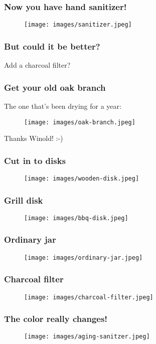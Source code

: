 \documentclass{beamer}
\begin{document}
\begin{frame}
\frametitle{Now you have hand sanitizer!}
\begin{figure}
\texttt{[image: images/sanitizer.jpeg]}
\end{figure}
\end{frame}

\begin{frame}
\frametitle{But could it be better?}
\huge{Add a charcoal filter?}
\end{frame}

\begin{frame}
\frametitle{Get your old oak branch}
The one that's been drying for a year:
\begin{figure}
\texttt{[image: images/oak-branch.jpeg]}
\end{figure}
Thanks Winold! :-)
\end{frame}

\begin{frame}
\frametitle{Cut in to disks}
\begin{figure}
\texttt{[image: images/wooden-disk.jpeg]}
\end{figure}
\end{frame}

\begin{frame}
\frametitle{Grill disk}
\begin{figure}
\texttt{[image: images/bbq-disk.jpeg]}
\end{figure}
\end{frame}

\begin{frame}
\frametitle{Ordinary jar}
\begin{figure}
\texttt{[image: images/ordinary-jar.jpeg]}
\end{figure}
\end{frame}

\begin{frame}
\frametitle{Charcoal filter}
\begin{figure}
\texttt{[image: images/charcoal-filter.jpeg]}
\end{figure}
\end{frame}

\begin{frame}
\frametitle{The color really changes!}
\begin{figure}
\texttt{[image: images/aging-sanitzer.jpeg]}
\end{figure}
\end{frame}
\end{document}
